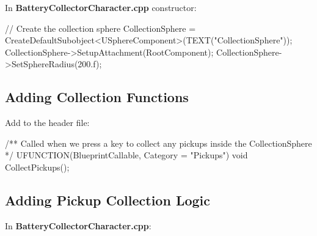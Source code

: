 \documentclass[
  letterpaper,
  DIV=11,
  numbers=noendperiod]{scrartcl}
\newenvironment{Shaded}{\begin{snugshade}}{\end{snugshade}}
\newcommand{\BuiltInTok}[1]{\textcolor[rgb]{0.00,0.23,0.31}{#1}}
\newcommand{\CommentTok}[1]{\textcolor[rgb]{0.37,0.37,0.37}{#1}}
\newcommand{\DataTypeTok}[1]{\textcolor[rgb]{0.68,0.00,0.00}{#1}}
\newcommand{\FloatTok}[1]{\textcolor[rgb]{0.68,0.00,0.00}{#1}}
\newcommand{\NormalTok}[1]{\textcolor[rgb]{0.00,0.23,0.31}{#1}}
\newcommand{\OperatorTok}[1]{\textcolor[rgb]{0.37,0.37,0.37}{#1}}
\newcommand{\StringTok}[1]{\textcolor[rgb]{0.13,0.47,0.30}{#1}}
\begin{document}
In \textbf{BatteryCollectorCharacter.cpp} constructor:

\begin{Shaded}
\begin{Highlighting}[]
\CommentTok{// Create the collection sphere}
\NormalTok{CollectionSphere }\OperatorTok{=}\NormalTok{ CreateDefaultSubobject}\OperatorTok{\textless{}}\NormalTok{USphereComponent}\OperatorTok{\textgreater{}(}\NormalTok{TEXT}\OperatorTok{(}\StringTok{"CollectionSphere"}\OperatorTok{));}
\NormalTok{CollectionSphere}\OperatorTok{{-}\textgreater{}}\NormalTok{SetupAttachment}\OperatorTok{(}\NormalTok{RootComponent}\OperatorTok{);}
\NormalTok{CollectionSphere}\OperatorTok{{-}\textgreater{}}\NormalTok{SetSphereRadius}\OperatorTok{(}\FloatTok{200.}\BuiltInTok{f}\OperatorTok{);}
\end{Highlighting}
\end{Shaded}

\subsection{Adding Collection
Functions}\label{adding-collection-functions}

Add to the header file:

\begin{Shaded}
\begin{Highlighting}[]
\CommentTok{/** Called when we press a key to collect any pickups inside the CollectionSphere */}
\NormalTok{UFUNCTION}\OperatorTok{(}\NormalTok{BlueprintCallable}\OperatorTok{,}\NormalTok{ Category }\OperatorTok{=} \StringTok{"Pickups"}\OperatorTok{)}
\DataTypeTok{void}\NormalTok{ CollectPickups}\OperatorTok{();}
\end{Highlighting}
\end{Shaded}

\subsection{Adding Pickup Collection
Logic}\label{adding-pickup-collection-logic}

In \textbf{BatteryCollectorCharacter.cpp}:
\end{document}
